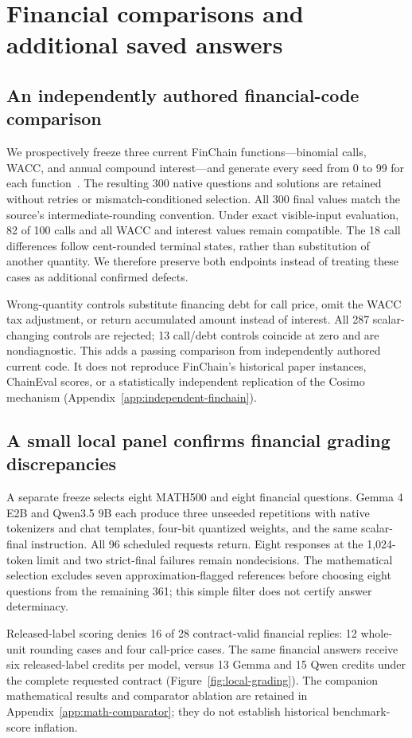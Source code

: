 \section{Financial comparisons and additional saved answers}
\subsection{An independently authored financial-code comparison}
We prospectively freeze three current FinChain functions---binomial calls, WACC, and annual compound interest---and generate every seed from 0 to 99 for each function~\cite{finchain,finchaincode}. The resulting 300 native questions and solutions are retained without retries or mismatch-conditioned selection. All 300 final values match the source's intermediate-rounding convention. Under exact visible-input evaluation, 82 of 100 calls and all WACC and interest values remain compatible. The 18 call differences follow cent-rounded terminal states, rather than substitution of another quantity. We therefore preserve both endpoints instead of treating these cases as additional confirmed defects.

Wrong-quantity controls substitute financing debt for call price, omit the WACC tax adjustment, or return accumulated amount instead of interest. All 287 scalar-changing controls are rejected; 13 call/debt controls coincide at zero and are nondiagnostic. This adds a passing comparison from independently authored current code. It does not reproduce FinChain's historical paper instances, ChainEval scores, or a statistically independent replication of the Cosimo mechanism (Appendix~\ref{app:independent-finchain}).

\subsection{A small local panel confirms financial grading discrepancies}
A separate freeze selects eight MATH500 and eight financial questions. Gemma 4 E2B and Qwen3.5 9B each produce three unseeded repetitions with native tokenizers and chat templates, four-bit quantized weights, and the same scalar-final instruction. All 96 scheduled requests return. Eight responses at the 1,024-token limit and two strict-final failures remain nondecisions. The mathematical selection excludes seven approximation-flagged references before choosing eight questions from the remaining 361; this simple filter does not certify answer determinacy.

Released-label scoring denies 16 of 28 contract-valid financial replies: 12 whole-unit rounding cases and four call-price cases. The same financial answers receive six released-label credits per model, versus 13 Gemma and 15 Qwen credits under the complete requested contract (Figure~\ref{fig:local-grading}). The companion mathematical results and comparator ablation are retained in Appendix~\ref{app:math-comparator}; they do not establish historical benchmark-score inflation.

